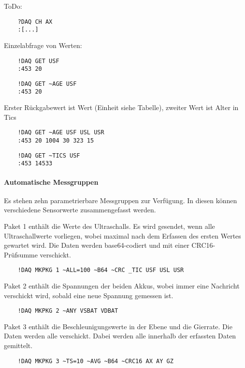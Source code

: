 \textcolor[rgb]{1,0,0}{ToDo:}
\begin{verbatim}
	?DAQ CH AX
	:[...]
\end{verbatim}



Einzelabfrage von Werten:
\begin{verbatim}
	!DAQ GET USF
	:453 20
\end{verbatim}


\begin{verbatim}
	!DAQ GET ~AGE USF
	:453 20
\end{verbatim}

Erster Rückgabewert ist Wert (Einheit siehe Tabelle), zweiter Wert ist Alter in Tics

\begin{verbatim}
	!DAQ GET ~AGE USF USL USR
	:453 20 1004 30 323 15
\end{verbatim}



\begin{verbatim}
	!DAQ GET ~TICS USF
	:453 14533
\end{verbatim}


\paragraph{Automatische Messgruppen}

Es stehen zehn parametrierbare Messgruppen zur Verfügung. In diesen können verschiedene Sensorwerte zusammengefasst werden.

Paket 1 enthält die Werte des Ultraschalls. Es wird gesendet, wenn alle Ultraschallwerte vorliegen, wobei maximal  nach dem Erfassen des ersten Wertes gewartet wird. Die Daten werden base64-codiert und mit einer CRC16-Prüfsumme verschickt.
\begin{verbatim}
	!DAQ MKPKG 1 ~ALL=100 ~B64 ~CRC _TIC USF USL USR 
\end{verbatim}

Paket 2 enthält die Spannungen der beiden Akkus, wobei immer eine Nachricht verschickt wird, sobald eine neue Spannung gemessen ist.
\begin{verbatim}
	!DAQ MKPKG 2 ~ANY VSBAT VDBAT 
\end{verbatim}

Paket 3 enthält die Beschleunigungswerte in der Ebene und die Gierrate. Die Daten werden alle  verschickt. Dabei werden alle innerhalb der  erfassten Daten gemittelt.
\begin{verbatim}
	!DAQ MKPKG 3 ~TS=10 ~AVG ~B64 ~CRC16 AX AY GZ 
\end{verbatim}


